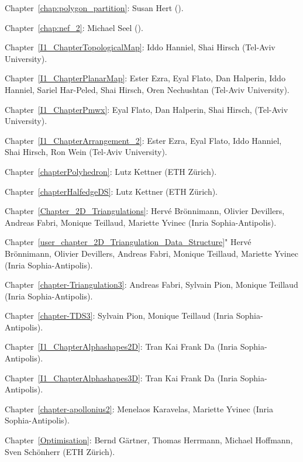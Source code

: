 \noindent
Chapter~\ref{chap:polygon_partition}: Susan Hert 
().

\noindent
Chapter~\ref{chap:nef_2}: Michael Seel 
().

\noindent
Chapter~\ref{I1_ChapterTopologicalMap}: Iddo Hanniel, Shai Hirsch 
(Tel-Aviv University).

\noindent
Chapter~\ref{I1_ChapterPlanarMap}: Ester Ezra, Eyal Flato, Dan Halperin, 
Iddo Hanniel, Sariel Har-Peled, Shai Hirsch, Oren Nechushtan 
(Tel-Aviv University).

\noindent
Chapter~\ref{I1_ChapterPmwx}: Eyal Flato, Dan Halperin, Shai Hirsch,
(Tel-Aviv University).

\noindent
Chapter~\ref{I1_ChapterArrangement_2}: Ester Ezra, Eyal Flato, 
Iddo Hanniel, Shai Hirsch, Ron Wein (Tel-Aviv University).


\noindent
Chapter~\ref{chapterPolyhedron}: Lutz Kettner (ETH Z\"urich).

\noindent
Chapter~\ref{chapterHalfedgeDS}: Lutz Kettner (ETH Z\"urich).

\noindent
Chapter~\ref{Chapter_2D_Triangulations}: 
Herv\'e Br\"onnimann, Olivier Devillers, Andreas Fabri,
Monique Teillaud, Mariette Yvinec ({\sc Inria} Sophia-Antipolis).

\noindent
Chapter~\ref{user_chapter_2D_Triangulation_Data_Structure}"
Herv\'e Br\"onnimann, Olivier Devillers, Andreas Fabri,
Monique Teillaud, Mariette Yvinec ({\sc Inria} Sophia-Antipolis).


\noindent
Chapter~\ref{chapter-Triangulation3}: 
Andreas Fabri, Sylvain Pion, Monique Teillaud ({\sc Inria} Sophia-Antipolis).

\noindent
Chapter~\ref{chapter-TDS3}: 
Sylvain Pion, Monique Teillaud ({\sc Inria} Sophia-Antipolis).

\noindent
Chapter~\ref{I1_ChapterAlphashapes2D}: 
Tran Kai Frank Da ({\sc Inria} Sophia-Antipolis).

\noindent
Chapter~\ref{I1_ChapterAlphashapes3D}: 
Tran Kai Frank Da ({\sc Inria} Sophia-Antipolis).

\noindent
Chapter~\ref{chapter-apollonius2}: Menelaos Karavelas, Mariette Yvinec ({\sc Inria} Sophia-Antipolis).



\noindent
Chapter~\ref{Optimisation}: Bernd G\"artner, Thomas Herrmann, Michael Hoffmann,
Sven Sch\"onherr (ETH Z\"urich).

